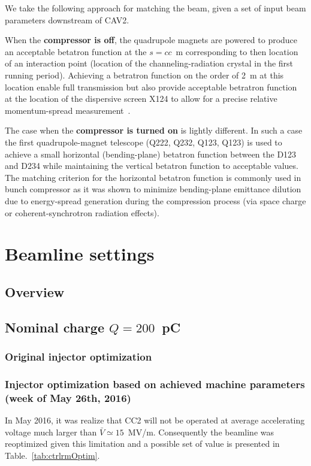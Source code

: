 \documentclass[notitlepage,twocolumn,nofootinbib,showpacs,preprintnumbers,superscriptaddress,amsmath,amssymb]{revtex4-1}
\begin{document}
We take the following approach for matching the beam, given a set of input beam parameters downstream of CAV2. 

When the {\bf compressor is off}, the quadrupole magnets are powered to produce an acceptable betatron function at the $s=cc$~m corresponding to then location of an interaction point (location of the channeling-radiation crystal in the first running period). Achieving a betratron function on the order of 2~m at this location enable full transmission but also provide acceptable betratron function at the location of the dispersive screen X124 to allow for a precise relative momentum-spread measurement~\cite{francoisIPAC13}. 

The case when the {\bf compressor is turned on} is lightly different. In such a case the first quadrupole-magnet  telescope (Q222, Q232, Q123, Q123) is used to achieve a small horizontal (bending-plane) betatron function between the D123 and D234 while maintaining the vertical betatron function to acceptable values. The matching criterion for the horizontal betatron function is commonly used in bunch compressor as it was shown to minimize bending-plane emittance dilution due to energy-spread generation during the compression process (via space charge or coherent-synchrotron radiation effects). 


\section{Beamline settings}
%
\subsection{Overview}

\subsection{Nominal charge $Q=200$~pC}
\subsubsection{Original injector optimization}

\subsubsection{Injector optimization based on achieved machine parameters (week of May 26th, 2016)}
In May 2016, it was realize that CC2 will not be operated at average accelerating voltage much larger than $\bar{V}\simeq 15$~MV/m. Consequently the beamline was reoptimized given this limitation and a possible set of value is presented in Table.~\ref{tab:ctrlrmOptim}. 
\end{document}
